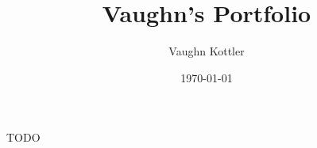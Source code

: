 \documentclass{beamer}
\title{Vaughn's Portfolio}
\author{Vaughn Kottler}
\date{\today}
\begin{document}
\begin{frame}
TODO
\end{frame}
\end{document}
